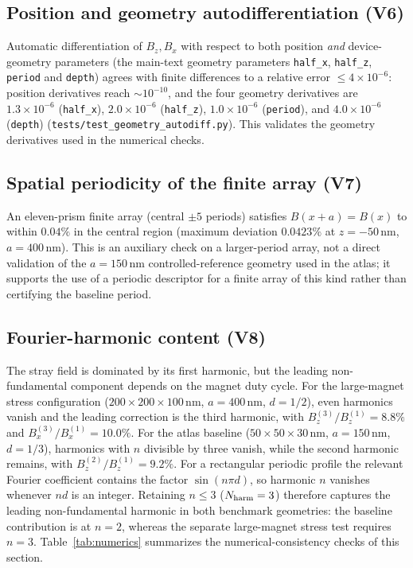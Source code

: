 \documentclass[aip,jap,reprint,onecolumn,superscriptaddress,longbibliography]{revtex4-2}
\begin{document}
\subsection{Position and geometry autodifferentiation (V6)}
Automatic differentiation of $B_z,B_x$ with respect to both position
\emph{and} device-geometry parameters (the main-text geometry parameters
\texttt{half\_x}, \texttt{half\_z}, \texttt{period} and \texttt{depth}) agrees
with finite differences to a relative error
$\le 4\times10^{-6}$: position derivatives reach
$\sim\!10^{-10}$, and the four geometry derivatives are
$1.3\times10^{-6}$ (\texttt{half\_x}), $2.0\times10^{-6}$
(\texttt{half\_z}), $1.0\times10^{-6}$ (\texttt{period}), and
$4.0\times10^{-6}$ (\texttt{depth}) (\texttt{tests/test\_geometry\_autodiff.py}).
This validates the geometry derivatives used in the numerical checks.

\subsection{Spatial periodicity of the finite array (V7)}
An eleven-prism finite array (central $\pm5$ periods) satisfies
$B(x+a)=B(x)$ to within $0.04\%$ in the central region (maximum
deviation $0.0423\%$ at $z=-50$\,nm, $a=400$\,nm). This is an auxiliary
check on a larger-period array, not a direct validation of the
$a=150$\,nm controlled-reference geometry used in the atlas; it supports
the use of a periodic descriptor for a finite array of this kind rather
than certifying the baseline period.

\subsection{Fourier-harmonic content (V8)}
The stray field is dominated by its first harmonic, but the leading
non-fundamental component depends on the magnet duty cycle. For the
large-magnet stress configuration ($200\times200\times100$\,nm,
$a=400$\,nm, $d=1/2$), even harmonics vanish and the leading correction is
the third harmonic, with $B_z^{(3)}/B_z^{(1)}=8.8\%$ and
$B_x^{(3)}/B_x^{(1)}=10.0\%$. For the atlas baseline
($50\times50\times30$\,nm, $a=150$\,nm, $d=1/3$), harmonics with $n$
divisible by three vanish, while the second harmonic remains, with
$B_z^{(2)}/B_z^{(1)}=9.2\%$. For a rectangular periodic profile the relevant
Fourier coefficient contains the factor $\sin(n\pi d)$, so harmonic $n$
vanishes whenever $nd$ is an integer. Retaining $n\le3$
($N_{\rm harm}=3$) therefore captures the leading non-fundamental harmonic in
both benchmark geometries: the baseline contribution is at $n=2$, whereas the
separate large-magnet stress test requires $n=3$. Table~\ref{tab:numerics}
summarizes the numerical-consistency checks of this section.
\end{document}
